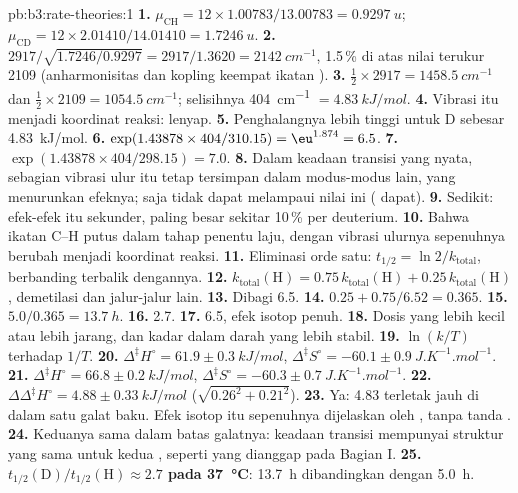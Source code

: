 \begin{solution}{pb:b3:rate-theories:1}
\textbf{1.} $\mu_{\mathrm{CH}} = 12 \times 1.00783/13.00783 = \qty{0.9297}{u}$; $\mu_{\mathrm{CD}} = 12 \times 2.01410/14.01410 =
\qty{1.7246}{u}$.
\textbf{2.} $2917/\sqrt{1.7246/0.9297} = 2917/1.3620 = \qty{2142}{cm^{-1}}$, 1.5\,\% di atas
nilai terukur 2109 (anharmonisitas dan kopling keempat ikatan ).
\textbf{3.} $\frac12 \times 2917 = \qty{1458.5}{cm^{-1}}$ dan $\frac12 \times 2109 = \qty{1054.5}{cm^{-1}}$;
selisihnya \qty{404}{cm^{-1}} $= \qty{4.83}{kJ/mol}$.
\textbf{4.} Vibrasi itu menjadi koordinat reaksi:  lenyap.
\textbf{5.} Penghalangnya lebih tinggi untuk D sebesar \qty{4.83}{kJ/mol}.
\textbf{6.} $\exp(1.43878 \times 404/310.15) = \eu^{1.874} = 6.5$.
\textbf{7.} $\exp(1.43878 \times 404/298.15) = 7.0$.
\textbf{8.} Dalam keadaan transisi yang nyata, sebagian  vibrasi
ulur itu tetap tersimpan dalam modus-modus lain, yang menurunkan efeknya;
 saja tidak dapat melampaui nilai ini ( dapat).
\textbf{9.} Sedikit: efek-efek itu sekunder, paling besar sekitar 10\,\% per
deuterium.
\textbf{10.} Bahwa ikatan C--H putus dalam tahap penentu laju, dengan vibrasi
ulurnya sepenuhnya berubah menjadi koordinat reaksi.
\textbf{11.} Eliminasi orde satu: $t_{1/2} = \ln2/k_{\mathrm{total}}$, berbanding terbalik
dengannya.
\textbf{12.} $k_{\mathrm{total}}(\mathrm H) = 0.75\,k_{\mathrm{total}}(\mathrm H) + 0.25\,k_{\mathrm{total}}(\mathrm H)$,
demetilasi dan jalur-jalur lain.
\textbf{13.} Dibagi 6.5.
\textbf{14.} $0.25 + 0.75/6.52 = 0.365$.
\textbf{15.} $5.0/0.365 = \qty{13.7}{h}$.
\textbf{16.} 2.7.
\textbf{17.} 6.5, efek isotop penuh.
\textbf{18.} Dosis yang lebih kecil atau lebih jarang, dan kadar dalam darah
yang lebih stabil.
\textbf{19.} $\ln(k/T)$ terhadap $1/T$.
\textbf{20.} $\Delta^{\ddagger}H^\circ = 61.9 \pm \qty{0.3}{kJ/mol}$, $\Delta^{\ddagger}S^\circ = -60.1 \pm \qty{0.9}{J.K^{-1}.mol^{-1}}$.
\textbf{21.} $\Delta^{\ddagger}H^\circ = 66.8 \pm \qty{0.2}{kJ/mol}$, $\Delta^{\ddagger}S^\circ = -60.3 \pm \qty{0.7}{J.K^{-1}.mol^{-1}}$.
\textbf{22.} $\Delta\Delta^{\ddagger}H^\circ = 4.88 \pm \qty{0.33}{kJ/mol}$ ($\sqrt{0.26^2 + 0.21^2}$).
\textbf{23.} Ya: 4.83 terletak jauh di dalam satu galat baku. Efek isotop itu
sepenuhnya dijelaskan oleh , tanpa tanda .
\textbf{24.} Keduanya sama dalam batas galatnya: keadaan transisi mempunyai
struktur yang sama untuk kedua , seperti yang dianggap pada
Bagian I.
\textbf{25.} \textbf{$t_{1/2}(\mathrm D)/t_{1/2}(\mathrm H) \approx 2.7$ pada \qty{37}{\celsius}}:
\qty{13.7}{h} dibandingkan dengan \qty{5.0}{h}.
\end{solution}
